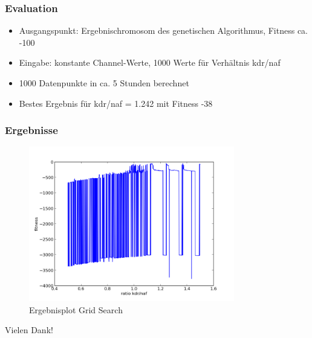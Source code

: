 \begin{frame}
\frametitle{Evaluation}
    \begin{itemize}
        \item Ausgangspunkt: Ergebnischromosom des genetischen Algorithmus, Fitness ca. -100
        \item Eingabe: konstante Channel-Werte, 1000 Werte für Verhältnis kdr/naf
        \item 1000 Datenpunkte in ca. 5 Stunden berechnet
        \item Bestes Ergebnis für kdr/naf = 1.242 mit Fitness -38
    \end{itemize}
\end{frame}

\begin{frame}
\frametitle{Ergebnisse}
        \begin{figure}
        \includegraphics[width=0.8\textwidth]{sa-gs/plot.png}
        \caption{Ergebnisplot Grid Search}
    \end{figure}
\end{frame}

\begin{frame}
    \begin{center}
        \large{Vielen Dank!}
    \end{center}
\end{frame}
